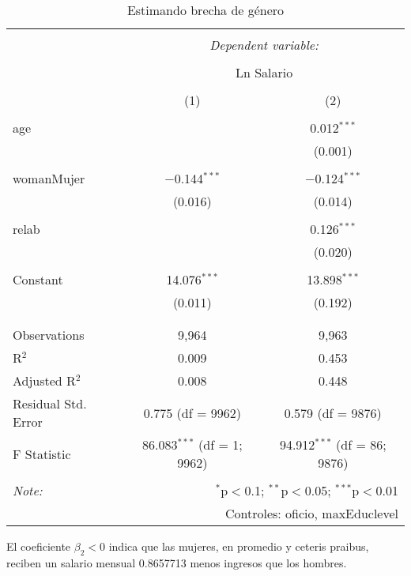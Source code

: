 \documentclass[
  11pt,
  letterpaper,
]{article}
\begin{document}
\begin{table}[!htbp] \centering 
  \caption{Estimando brecha de género} 
  \label{} 
\begin{tabular}{@{\extracolsep{5pt}}lcc} 
\\[-1.8ex]\hline 
\hline \\[-1.8ex] 
 & \multicolumn{2}{c}{\textit{Dependent variable:}} \\ 
\cline{2-3} 
\\[-1.8ex] & \multicolumn{2}{c}{Ln Salario} \\ 
\\[-1.8ex] & (1) & (2)\\ 
\hline \\[-1.8ex] 
 age &  & 0.012$^{***}$ \\ 
  &  & (0.001) \\ 
  & & \\ 
 womanMujer & $-$0.144$^{***}$ & $-$0.124$^{***}$ \\ 
  & (0.016) & (0.014) \\ 
  & & \\ 
 relab &  & 0.126$^{***}$ \\ 
  &  & (0.020) \\ 
  & & \\ 
 Constant & 14.076$^{***}$ & 13.898$^{***}$ \\ 
  & (0.011) & (0.192) \\ 
  & & \\ 
\hline \\[-1.8ex] 
Observations & 9,964 & 9,963 \\ 
R$^{2}$ & 0.009 & 0.453 \\ 
Adjusted R$^{2}$ & 0.008 & 0.448 \\ 
Residual Std. Error & 0.775 (df = 9962) & 0.579 (df = 9876) \\ 
F Statistic & 86.083$^{***}$ (df = 1; 9962) & 94.912$^{***}$ (df = 86; 9876) \\ 
\hline 
\hline \\[-1.8ex] 
\textit{Note:}  & \multicolumn{2}{r}{$^{*}$p$<$0.1; $^{**}$p$<$0.05; $^{***}$p$<$0.01} \\ 
 & \multicolumn{2}{r}{Controles: oficio, maxEduclevel} \\ 
\end{tabular} 
\end{table}

El coeficiente \(\beta_2<0\) indica que las mujeres, en promedio y
ceteris praibus, reciben un salario mensual 0.8657713 menos ingresos que
los hombres.
\end{document}
